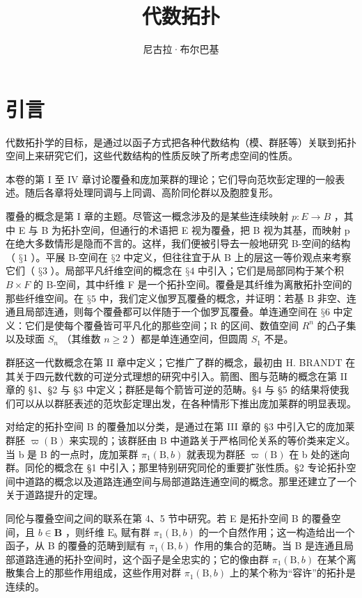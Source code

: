 \documentclass[UTF8,12pt,a4paper,oneside]{ctexbook}
\title{代数拓扑}
\author{尼古拉·布尔巴基}
\date{}
\newcommand{\specialchapter}[1]{%
  \chapter*{#1}%
  \phantomsection
  \addcontentsline{toc}{chapter}{#1}%
}
\begin{document}
\maketitle
\clearpage
\frontmatter
\tableofcontents
\specialchapter{引言}

代数拓扑学的目标，是通过以函子方式把各种代数结构（模、群胚等）关联到拓扑空间上来研究它们，这些代数结构的性质反映了所考虑空间的性质。

本卷的第 I 至 IV 章讨论覆叠和庞加莱群的理论；它们导向范坎彭定理的一般表述。随后各章将处理同调与上同调、高阶同伦群以及胞腔复形。

覆叠的概念是第 I 章的主题。尽管这一概念涉及的是某些连续映射 \(p: E \rightarrow B\) ，其中 E 与 B 为拓扑空间，但通行的术语把 E 视为覆叠，把 B 视为其基，而映射 p 在绝大多数情形是隐而不言的。这样，我们便被引导去一般地研究 B-空间的结构（ \(§1\) ）。平展 B-空间在 \(§2\) 中定义，但往往宜于从 B 上的层这一等价观点来考察它们（ \(§3\) ）。局部平凡纤维空间的概念在 \(§4\) 中引入；它们是局部同构于某个积 \(B \times F\) 的 B-空间，其中纤维 F 是一个拓扑空间。覆叠是其纤维为离散拓扑空间的那些纤维空间。在 \(§5\) 中，我们定义伽罗瓦覆叠的概念，并证明：若基 B 非空、连通且局部连通，则每个覆叠都可以伴随于一个伽罗瓦覆叠。单连通空间在 \(§6\) 中定义：它们是使每个覆叠皆可平凡化的那些空间；R 的区间、数值空间 \(R^{n}\) 的凸子集以及球面 \(S_{n}\) （其维数 \(n \geqslant 2\) ）都是单连通空间，但圆周 \(S_{1}\) 不是。

群胚这一代数概念在第 II 章中定义；它推广了群的概念，最初由 H. BRANDT 在其关于四元数代数的可逆分式理想的研究中引入。箭图、图与范畴的概念在第 II 章的 §1、§2 与 §3 中定义；群胚是每个箭皆可逆的范畴。§4 与 §5 的结果将使我们可以从以群胚表述的范坎彭定理出发，在各种情形下推出庞加莱群的明显表现。

对给定的拓扑空间 B 的覆叠加以分类，是通过在第 III 章的 §3 中引入它的庞加莱群胚 \(\varpi(\mathrm{B})\) 来实现的；该群胚由 B 中道路关于严格同伦关系的等价类来定义。当 b 是 B 的一点时，庞加莱群 \(\pi_{1}(\mathrm{B},b)\) 就表现为群胚 \(\varpi(\mathrm{B})\) 在 b 处的迷向群。同伦的概念在 §1 中引入；那里特别研究同伦的重要扩张性质。§2 专论拓扑空间中道路的概念以及道路连通空间与局部道路连通空间的概念。那里还建立了一个关于道路提升的定理。

同伦与覆叠空间之间的联系在第 4、5 节中研究。若 E 是拓扑空间 B 的覆叠空间，且 \(b \in \mathbf{B}\) ，则纤维 \(\mathrm{E}_b\) 赋有群 \(\pi_1(\mathrm{B}, b)\) 的一个自然作用；这一构造给出一个函子，从 B 的覆叠的范畴到赋有 \(\pi_1(\mathrm{B}, b)\) 作用的集合的范畴。当 B 是连通且局部道路连通的拓扑空间时，这个函子是全忠实的；它的像由群 \(\pi_1(\mathrm{B}, b)\) 在某个离散集合上的那些作用组成，这些作用对群 \(\pi_1(\mathrm{B}, b)\) 上的某个称为“容许”的拓扑是连续的。
\end{document}
